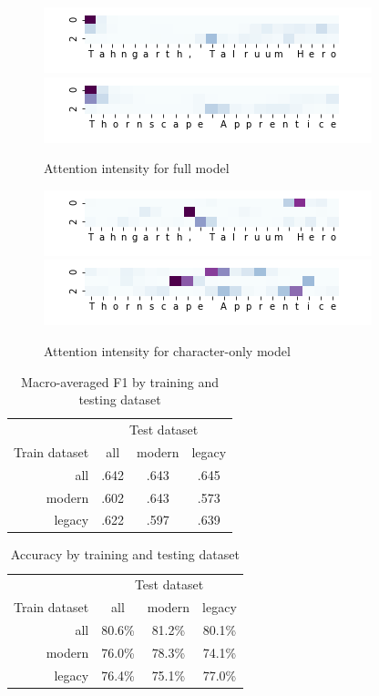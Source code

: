 \documentclass[letterpaper]{article} %
\begin{document}
\begin{figure}
  \includegraphics[width=.45\textwidth]{tahngarth-attention-wv}
  \includegraphics[width=.45\textwidth]{thornscape-attention-wv}
  \caption{Attention intensity for full model}
\end{figure}

\begin{figure}
  \includegraphics[width=.45\textwidth]{tahngarth-attention-char}
  \includegraphics[width=.45\textwidth]{thornscape-attention-char}
  \caption{Attention intensity for character-only model}
\end{figure}

\begin{table}
  \centering
  \caption{Macro-averaged F1 by training and testing dataset}
  \begin{tabular}{r | c | c | c}
    & \multicolumn{3}{c}{Test dataset}\\
    \cline{2-4}
    Train dataset & all & modern & legacy \\
    \hline
    all    & .642 & .643 & .645 \\
    modern & .602 & .643 & .573 \\
    legacy & .622 & .597 & .639 \\
  \end{tabular}
\end{table}

\begin{table}
  \centering
  \caption{Accuracy by training and testing dataset}
  \begin{tabular}{r | c | c | c}
    & \multicolumn{3}{c}{Test dataset}\\
    \cline{2-4}
    Train dataset & all & modern & legacy \\
    \hline
    all    & 80.6\% & 81.2\% & 80.1\% \\
    modern & 76.0\% & 78.3\% & 74.1\% \\
    legacy & 76.4\% & 75.1\% & 77.0\% \\
  \end{tabular}
\end{table}
\end{document}
